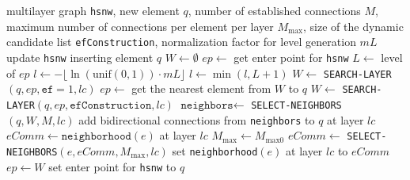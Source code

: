 \begin{algorithm}[H]
\caption{INSERT(\texttt{hsnw}, $q$, $M$, $M_{\text{max}}$, \texttt{efConstruction}, $mL$)}
\begin{algorithmic}[1]
\Require multilayer graph \texttt{hsnw}, new element $q$, number of established connections $M$, maximum number of connections per element per layer $M_{\text{max}}$, size of the dynamic candidate list \texttt{efConstruction}, normalization factor for level generation $mL$
\Ensure update \texttt{hsnw} inserting element $q$
\State $W \gets \emptyset$ 
\State $ep \gets$ get enter point for \texttt{hsnw}
\State $L \gets$ level of $ep$ 
\State $l \gets -\lfloor \ln(\text{unif}(0,1)) \cdot mL \rfloor$ 
\State $l \gets \min(l, L + 1)$
    \State $W \gets$ \texttt{SEARCH-LAYER}$(q, ep, \texttt{ef}=1, lc)$
    \State $ep \gets$ get the nearest element from $W$ to $q$
\EndFor
{}
    \State $W \gets$ \texttt{SEARCH-LAYER}$(q, ep, \texttt{efConstruction}, lc)$
    \State $\texttt{neighbors} \gets$ \texttt{SELECT-NEIGHBORS}$(q, W, M, lc)$ 
    \State add bidirectional connections from \texttt{neighbors} to $q$ at layer $lc$
        \State $eComm \gets \texttt{neighborhood}(e)$ at layer $lc$
         
             
                \State $M_{\text{max}} \gets M_{\text{max}0}$
            \EndIf
            \State $eComm \gets$ \texttt{SELECT-NEIGHBORS}$(e, eComm, M_{\text{max}}, lc)$ 
        \EndIf
        \State set \texttt{neighborhood}$(e)$ at layer $lc$ to $eComm$
    \EndFor
\EndFor
\State $ep \gets W$
\State set enter point for \texttt{hsnw} to $q$
\end{algorithmic}
\end{algorithm}